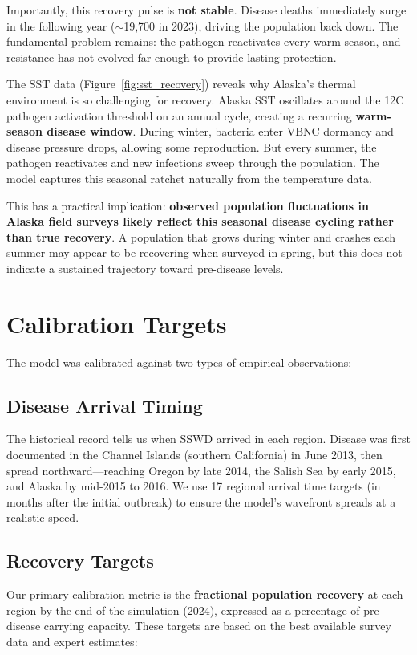 \documentclass[11pt]{article}
\begin{document}
Importantly, this recovery pulse is \textbf{not stable}. Disease deaths immediately surge in the following year ($\sim$19,700 in 2023), driving the population back down. The fundamental problem remains: the pathogen reactivates every warm season, and resistance has not evolved far enough to provide lasting protection.

The SST data (Figure~\ref{fig:sst_recovery}) reveals why Alaska's thermal environment is so challenging for recovery. Alaska SST oscillates around the 12\textdegree C pathogen activation threshold on an annual cycle, creating a recurring \textbf{warm-season disease window}. During winter, bacteria enter VBNC dormancy and disease pressure drops, allowing some reproduction. But every summer, the pathogen reactivates and new infections sweep through the population. The model captures this seasonal ratchet naturally from the temperature data.

This has a practical implication: \textbf{observed population fluctuations in Alaska field surveys likely reflect this seasonal disease cycling rather than true recovery}. A population that grows during winter and crashes each summer may appear to be recovering when surveyed in spring, but this does not indicate a sustained trajectory toward pre-disease levels.

\section{Calibration Targets}

The model was calibrated against two types of empirical observations:

\subsection*{Disease Arrival Timing}
The historical record tells us when SSWD arrived in each region. Disease was first documented in the Channel Islands (southern California) in June 2013, then spread northward---reaching Oregon by late 2014, the Salish Sea by early 2015, and Alaska by mid-2015 to 2016. We use 17 regional arrival time targets (in months after the initial outbreak) to ensure the model's wavefront spreads at a realistic speed.

\subsection*{Recovery Targets}
Our primary calibration metric is the \textbf{fractional population recovery} at each region by the end of the simulation (2024), expressed as a percentage of pre-disease carrying capacity. These targets are based on the best available survey data and expert estimates:
\end{document}
